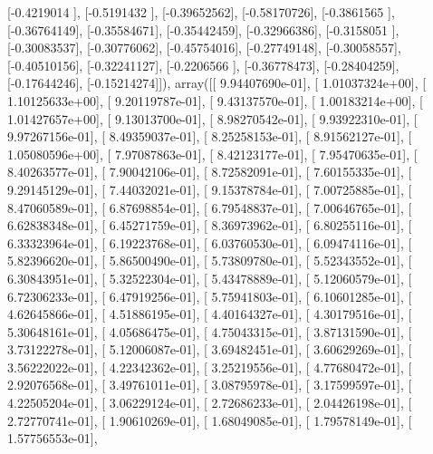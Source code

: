 \documentclass{article}
\begin{document}
       [-0.4219014 ],
       [-0.5191432 ],
       [-0.39652562],
       [-0.58170726],
       [-0.3861565 ],
       [-0.36764149],
       [-0.35584671],
       [-0.35442459],
       [-0.32966386],
       [-0.3158051 ],
       [-0.30083537],
       [-0.30776062],
       [-0.45754016],
       [-0.27749148],
       [-0.30058557],
       [-0.40510156],
       [-0.32241127],
       [-0.2206566 ],
       [-0.36778473],
       [-0.28404259],
       [-0.17644246],
       [-0.15214274]]), array([[  9.94407690e-01],
       [  1.01037324e+00],
       [  1.10125633e+00],
       [  9.20119787e-01],
       [  9.43137570e-01],
       [  1.00183214e+00],
       [  1.01427657e+00],
       [  9.13013700e-01],
       [  8.98270542e-01],
       [  9.93922310e-01],
       [  9.97267156e-01],
       [  8.49359037e-01],
       [  8.25258153e-01],
       [  8.91562127e-01],
       [  1.05080596e+00],
       [  7.97087863e-01],
       [  8.42123177e-01],
       [  7.95470635e-01],
       [  8.40263577e-01],
       [  7.90042106e-01],
       [  8.72582091e-01],
       [  7.60155335e-01],
       [  9.29145129e-01],
       [  7.44032021e-01],
       [  9.15378784e-01],
       [  7.00725885e-01],
       [  8.47060589e-01],
       [  6.87698854e-01],
       [  6.79548837e-01],
       [  7.00646765e-01],
       [  6.62838348e-01],
       [  6.45271759e-01],
       [  8.36973962e-01],
       [  6.80255116e-01],
       [  6.33323964e-01],
       [  6.19223768e-01],
       [  6.03760530e-01],
       [  6.09474116e-01],
       [  5.82396620e-01],
       [  5.86500490e-01],
       [  5.73809780e-01],
       [  5.52343552e-01],
       [  6.30843951e-01],
       [  5.32522304e-01],
       [  5.43478889e-01],
       [  5.12060579e-01],
       [  6.72306233e-01],
       [  6.47919256e-01],
       [  5.75941803e-01],
       [  6.10601285e-01],
       [  4.62645866e-01],
       [  4.51886195e-01],
       [  4.40164327e-01],
       [  4.30179516e-01],
       [  5.30648161e-01],
       [  4.05686475e-01],
       [  4.75043315e-01],
       [  3.87131590e-01],
       [  3.73122278e-01],
       [  5.12006087e-01],
       [  3.69482451e-01],
       [  3.60629269e-01],
       [  3.56222022e-01],
       [  4.22342362e-01],
       [  3.25219556e-01],
       [  4.77680472e-01],
       [  2.92076568e-01],
       [  3.49761011e-01],
       [  3.08795978e-01],
       [  3.17599597e-01],
       [  4.22505204e-01],
       [  3.06229124e-01],
       [  2.72686233e-01],
       [  2.04426198e-01],
       [  2.72770741e-01],
       [  1.90610269e-01],
       [  1.68049085e-01],
       [  1.79578149e-01],
       [  1.57756553e-01],
\end{document}
